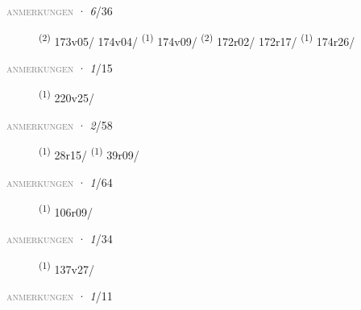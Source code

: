 \textsc{\textcolor{gray}{anmerkungen}}
\ENTRYEND
\noindent{} · \textit{6}/36 \LEMMALINE
\begin{description}
    \item[]  \textsuperscript{(2)} \mbox{173v05/} \mbox{174v04/} \textsuperscript{(1)} \mbox{174v09/} \CASEBREAK {} \textsuperscript{(2)} \mbox{172r02/} \mbox{172r17/} \textsuperscript{(1)} \mbox{174r26/}
\end{description}
\textsc{\textcolor{gray}{anmerkungen}}
\ENTRYEND
\noindent{} · \textit{1}/15 \LEMMALINE
\begin{description}
    \item[]  \textsuperscript{(1)} \mbox{220v25/}
\end{description}
\textsc{\textcolor{gray}{anmerkungen}}
\ENTRYEND
\noindent{} · \textit{2}/58 \LEMMALINE
\begin{description}
    \item[]  \textsuperscript{(1)} \mbox{28r15/} \textsuperscript{(1)} \mbox{39r09/}
\end{description}
\textsc{\textcolor{gray}{anmerkungen}}
\ENTRYEND
\noindent{} · \textit{1}/64 \LEMMALINE
\begin{description}
    \item[]  \textsuperscript{(1)} \mbox{106r09/}
\end{description}
\textsc{\textcolor{gray}{anmerkungen}}
\ENTRYEND
\noindent{} · \textit{1}/34 \LEMMALINE
\begin{description}
    \item[]  \textsuperscript{(1)} \mbox{137v27/}
\end{description}
\textsc{\textcolor{gray}{anmerkungen}}
\ENTRYEND
\noindent{} · \textit{1}/11 \LEMMALINE
